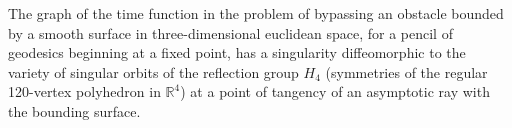 The graph of the time function in the problem of bypassing an obstacle bounded by a smooth surface in three-dimensional euclidean space, for a pencil of geodesics beginning at a fixed point, has a singularity diffeomorphic to the variety of singular orbits of the reflection group $H_4$ (symmetries of the regular 120-vertex polyhedron in $\mathbb{R}^4$) at a point of tangency of an asymptotic ray with the bounding surface.

